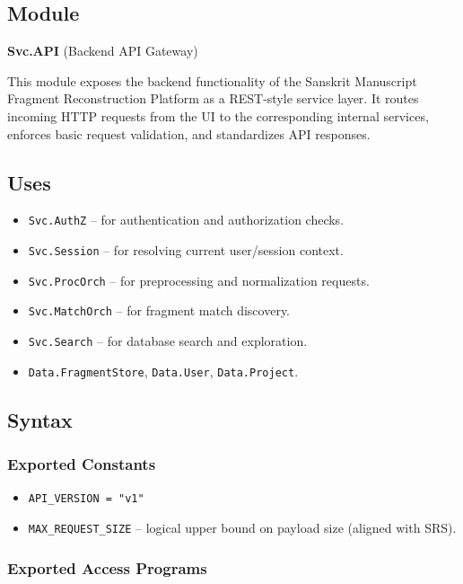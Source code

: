 \documentclass[12pt, titlepage]{article}
\begin{document}
\subsection{Module}
\textbf{Svc.API} \; (Backend API Gateway)

This module exposes the backend functionality of the Sanskrit Manuscript Fragment Reconstruction Platform as a REST-style service layer. It routes incoming HTTP requests from the UI to the corresponding internal services, enforces basic request validation, and standardizes API responses.

\subsection{Uses}
\begin{itemize}
    \item \texttt{Svc.AuthZ} – for authentication and authorization checks.
    \item \texttt{Svc.Session} – for resolving current user/session context.
    \item \texttt{Svc.ProcOrch} – for preprocessing and normalization requests.
    \item \texttt{Svc.MatchOrch} – for fragment match discovery.
    \item \texttt{Svc.Search} – for database search and exploration.
    \item \texttt{Data.FragmentStore}, \texttt{Data.User}, \texttt{Data.Project}.
\end{itemize}

\subsection{Syntax}

\subsubsection{Exported Constants}
\begin{itemize}
    \item \texttt{API\_VERSION = "v1"}
    \item \texttt{MAX\_REQUEST\_SIZE} – logical upper bound on payload size (aligned with SRS).
\end{itemize}

\subsubsection{Exported Access Programs}
\end{document}
